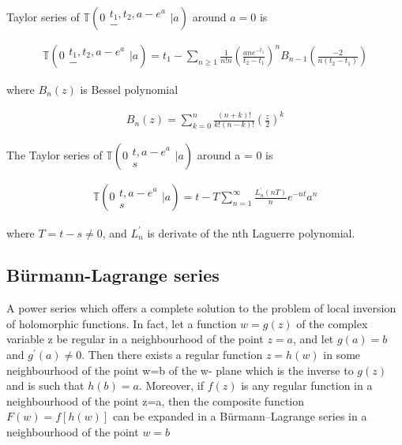 \begin{theorem}
        Taylor series of \(\mathbb{T}\left(0 \begin{matrix} t_1, t_2, a-e^a \\ -
        \end{matrix} \bigg| a \right)\) around \(a = 0\) is

        \begin{align}
                \mathbb{T}\left(0 \begin{matrix} t_1, t_2, a-e^a \\ - \end{matrix} \bigg| a  
                \right) = t_1 - \sum_{n \geq 1} \frac{1}{n!n} \left( \frac{ane^{-t_1}}{t_2 -
                t_1} \right)^n B_{n-1}\left( \frac{-2}{n(t_2 - t_1)}\right)
        \end{align}

        where \(B_n(z)\) is Bessel polynomial \cite{33}

        \begin{align}
                B_n(z) = \sum_{k=0}^n \frac{(n+k)!}{k!(n-k)!}
                \left( \frac{z}{2} \right)^k
        \end{align}
\end{theorem}

\begin{theorem}
        The Taylor series of \(\mathbb{T}\left( 0 \begin{matrix} t, a-e^a 
        \\ s \end{matrix} \bigg| a\right)\) around a = 0 is
        
        \begin{align}
                \mathbb{T}\left( 0 \begin{matrix} t, a-e^a \\ s \end{matrix} 
                \bigg| a \right) = t-T \sum_{n=1}^\infty \frac{L^{'}_n(n T)}{n}e^{-nt}a^n
        \end{align}
        
        where \(T = t - s \neq 0\), and \(L^{'}_n\) is derivate 
        of the nth Laguerre polynomial. \cite{32}
\end{theorem}

\subsection{Bürmann-Lagrange series}

A power series which offers a complete solution to the problem of local inversion 
of holomorphic functions. In fact, let a function \(w=g(z)\) of the complex variable
z be regular in a neighbourhood of the point \(z=a\), and let \(g(a)=b\) and 
\(g^′(a)\neq0\). Then there exists a regular function \(z=h(w)\) in some 
neighbourhood of the point w=b of the w- plane which is the inverse to \(g(z)\)
and is such that \(h(b)=a\). Moreover, if \(f(z)\) is any regular function in a 
neighbourhood of the point z=a, then the composite function \(F(w)=f[h(w)]\) can 
be expanded in a Bürmann–Lagrange series in a neighbourhood of the point \(w=b\)

